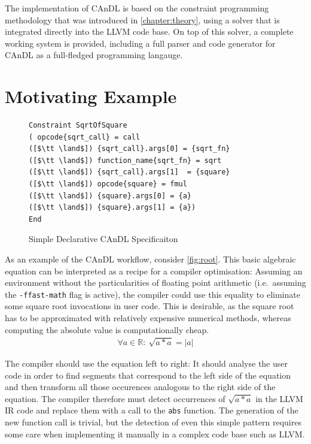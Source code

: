     The implementation of CAnDL is based on the constraint programming
    methodology that was introduced in \autoref{chapter:theory}, using a solver
    that is integrated directly into the LLVM code base.
    On top of this solver, a complete working system is provided, including a
    full parser and code generator for CAnDL as a full-fledged programming
    langauge.

\section{Motivating Example}

\begin{figure}[b]
\centering
\begin{minipage}[t]{0.67\textwidth}
\begin{lstlisting}[language=CAnDL]
Constraint SqrtOfSquare
( opcode{sqrt_call} = call
([$\tt \land$]) {sqrt_call}.args[0] = {sqrt_fn}
([$\tt \land$]) function_name{sqrt_fn} = sqrt
([$\tt \land$]) {sqrt_call}.args[1]  = {square}
([$\tt \land$]) opcode{square} = fmul
([$\tt \land$]) {square}.args[0] = {a}
([$\tt \land$]) {square}.args[1] = {a})
End
\end{lstlisting}
\end{minipage}
\caption{Simple Declarative CAnDL Specificaiton}
\label{fig:candlspec}
\end{figure}

    As an example of the CAnDL workflow, consider \autoref{fig:root}.
    This basic algebraic equation can be interpreted as a recipe for a compiler
    optimisation:
    Assuming an environment without the particularities of floating point
    arithmetic (i.e.\ assuming the \texttt{-ffast-math} flag is active), the
    compiler could use this equality to eliminate some square root invocations
    in user code.
    This is desirable, as the square root has to be approximated with relatively
    expensive numerical methods, whereas computing the absolute value is
    computationally cheap.
    \begin{align}
    \label{fig:root}
    \forall a\in \mathbb{R}\colon\ \sqrt{a*a}=|a|
    \end{align}

    The compiler should use the equation left to right:
    It should analyse the user code in order to find segments that correspond to
    the left side of the equation and then transform all those occurences
    analogous to the right side of the equation.
    The compiler therefore must detect occurrences of $\sqrt{a*a}$ in the
    LLVM IR code and replace them with a call to the \texttt{abs} function.
    The generation of the new function call is trivial, but the detection of
    even this simple pattern requires some care when implementing it manually in
    a complex code base such as LLVM.

